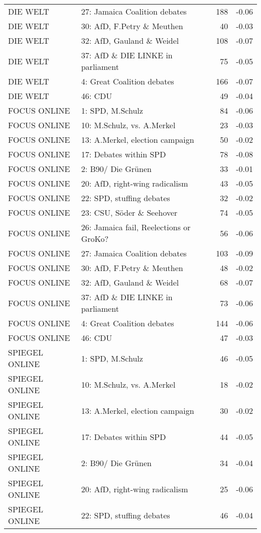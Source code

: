 \begin{adjustbox}{width=\textwidth}
\begin{tabular}{llrr}
  DIE WELT & 27: Jamaica Coalition debates & 188 & -0.06 \\ 
  DIE WELT & 30: AfD, F.Petry \& Meuthen &  40 & -0.03 \\ 
  DIE WELT & 32: AfD, Gauland \& Weidel & 108 & -0.07 \\ 
  DIE WELT & 37: AfD \& DIE LINKE in parliament &  75 & -0.05 \\ 
  DIE WELT & 4: Great Coalition debates & 166 & -0.07 \\ 
  DIE WELT & 46: CDU &  49 & -0.04 \\ 
  FOCUS ONLINE & 1: SPD, M.Schulz &  84 & -0.06 \\ 
  FOCUS ONLINE & 10: M.Schulz, vs. A.Merkel &  23 & -0.03 \\ 
  FOCUS ONLINE & 13: A.Merkel, election campaign &  50 & -0.02 \\ 
  FOCUS ONLINE & 17: Debates within SPD &  78 & -0.08 \\ 
  FOCUS ONLINE & 2: B90/ Die Grünen &  33 & -0.01 \\ 
  FOCUS ONLINE & 20: AfD, right-wing radicalism &  43 & -0.05 \\ 
  FOCUS ONLINE & 22: SPD, stuffing debates &  32 & -0.02 \\ 
  FOCUS ONLINE & 23: CSU, Söder \& Seehover &  74 & -0.05 \\ 
  FOCUS ONLINE & 26: Jamaica fail, Reelections or GroKo? &  56 & -0.06 \\ 
  FOCUS ONLINE & 27: Jamaica Coalition debates & 103 & -0.09 \\ 
  FOCUS ONLINE & 30: AfD, F.Petry \& Meuthen &  48 & -0.02 \\ 
  FOCUS ONLINE & 32: AfD, Gauland \& Weidel &  68 & -0.07 \\ 
  FOCUS ONLINE & 37: AfD \& DIE LINKE in parliament &  73 & -0.06 \\ 
  FOCUS ONLINE & 4: Great Coalition debates & 144 & -0.06 \\ 
  FOCUS ONLINE & 46: CDU &  47 & -0.03 \\ 
  SPIEGEL ONLINE & 1: SPD, M.Schulz &  46 & -0.05 \\ 
  SPIEGEL ONLINE & 10: M.Schulz, vs. A.Merkel &  18 & -0.02 \\ 
  SPIEGEL ONLINE & 13: A.Merkel, election campaign &  30 & -0.02 \\ 
  SPIEGEL ONLINE & 17: Debates within SPD &  44 & -0.05 \\ 
  SPIEGEL ONLINE & 2: B90/ Die Grünen &  34 & -0.04 \\ 
  SPIEGEL ONLINE & 20: AfD, right-wing radicalism &  25 & -0.06 \\ 
  SPIEGEL ONLINE & 22: SPD, stuffing debates &  46 & -0.04 \\ 
   \hline
\end{tabular}
\end{adjustbox}
